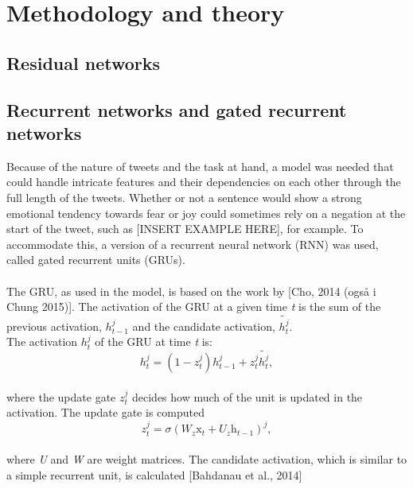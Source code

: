 \section{Methodology and theory}

\subsection{Residual networks}

\subsection{Recurrent networks and gated recurrent networks}
Because of the nature of tweets and the task at hand, a model was needed that could handle intricate features and their dependencies on each other through the full length of the tweets. Whether or not a sentence would show a strong emotional tendency towards fear or joy could sometimes rely on a negation at the start of the tweet, such as  [INSERT EXAMPLE HERE], for example. To accommodate this, a version of a recurrent neural network (RNN) was used, called gated recurrent units (GRUs).\\
\\
The GRU, as used in the model, is based on the work by [Cho, 2014 (også i Chung 2015)]. The activation of the GRU at a given time \textit{t} is the sum of the previous activation, $h_{t-1}^{j}$ and the candidate activation, $\tilde{h_{t}^{j}}$.\\
The activation $h_{t}^{j}$ of the GRU at time \textit{t} is:\\

\begin{equation} \label{eq:activation}
h_{t}^{j} = \left(1 - z_{t}^{j}\right)h_{t-1}^{j}+z_{t}^{j}\tilde{h_{t}^{j}},
\end{equation}\\

where the update gate $z_{t}^{j}$ decides how much of the unit is updated in the activation. The update gate is computed\\

\begin{equation}\label{eq:update}
z_{t}^{j}=\sigma\left(W_{z}\mathrm{x}_{t}+U_{z}\mathrm{h}_{t-1}\right)^{j},
\end{equation}\\

where \textit{U} and \textit{W} are weight matrices. The candidate activation, which is similar to a simple recurrent unit, is calculated [Bahdanau et al., 2014]\\


